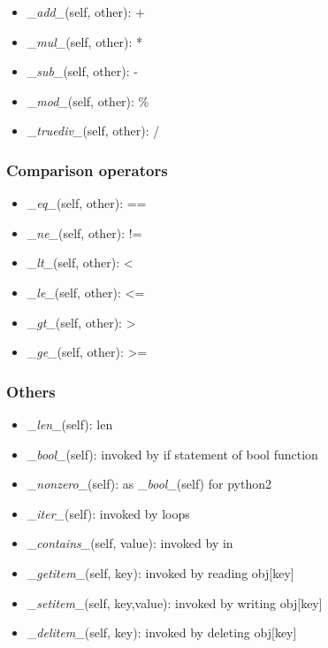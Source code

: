\documentclass[11pt]{article}
\providecommand{\tightlist}{%
      \setlength{\itemsep}{0pt}\setlength{\parskip}{0pt}}
\begin{document}
\begin{itemize}
\tightlist
\item
  \_\emph{add\_}(self, other): +
\item
  \_\emph{mul\_}(self, other): *
\item
  \_\emph{sub\_}(self, other): -
\item
  \_\emph{mod\_}(self, other): \%
\item
  \_\emph{truediv\_}(self, other): /
\end{itemize}

\hypertarget{comparison-operators}{%
\subsubsection{Comparison operators}\label{comparison-operators}}

\begin{itemize}
\tightlist
\item
  \_\emph{eq\_}(self, other): ==
\item
  \_\emph{ne\_}(self, other): !=
\item
  \_\emph{lt\_}(self, other): \textless{}
\item
  \_\emph{le\_}(self, other): \textless=
\item
  \_\emph{gt\_}(self, other): \textgreater{}
\item
  \_\emph{ge\_}(self, other): \textgreater=
\end{itemize}

\hypertarget{others}{%
\subsubsection{Others}\label{others}}

\begin{itemize}
\tightlist
\item
  \_\emph{len\_}(self): len
\item
  \_\emph{bool\_}(self): invoked by if statement of bool function\\
\item
  \_\emph{nonzero\_}(self): as \_\emph{bool\_}(self) for python2
\item
  \_\emph{iter\_}(self): invoked by loops
\item
  \_\emph{contains\_}(self, value): invoked by in
\item
  \_\emph{getitem\_}(self, key): invoked by reading obj{[}key{]}
\item
  \_\emph{setitem\_}(self, key,value): invoked by writing obj{[}key{]}
\item
  \_\emph{delitem\_}(self, key): invoked by deleting obj{[}key{]}
\end{itemize}
\end{document}

